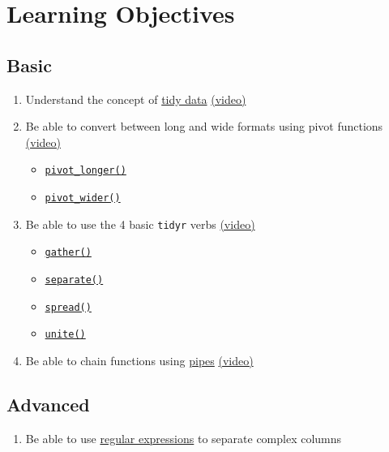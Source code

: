 \documentclass[
  oneside]{book}
\providecommand{\tightlist}{%
  \setlength{\itemsep}{0pt}\setlength{\parskip}{0pt}}
\begin{document}
\hypertarget{ilo-tidyr}{%
\section{Learning Objectives}\label{ilo-tidyr}}

\hypertarget{basic-2}{%
\subsection{Basic}\label{basic-2}}

\begin{enumerate}
\def\labelenumi{\arabic{enumi}.}
\tightlist
\item
  Understand the concept of \protect\hyperlink{tidy-data}{tidy data} \href{https://youtu.be/EsSN4OdsNpc}{(video)}
\item
  Be able to convert between long and wide formats using pivot functions \href{https://youtu.be/4dvLmjhwN8I}{(video)}

  \begin{itemize}
  \tightlist
  \item
    \protect\hyperlink{pivot_longer}{\texttt{pivot\_longer()}}
  \item
    \protect\hyperlink{pivot_wider}{\texttt{pivot\_wider()}}
  \end{itemize}
\item
  Be able to use the 4 basic \texttt{tidyr} verbs \href{https://youtu.be/oUWjb0JC8zM}{(video)}

  \begin{itemize}
  \tightlist
  \item
    \protect\hyperlink{gather}{\texttt{gather()}}
  \item
    \protect\hyperlink{separate}{\texttt{separate()}}
  \item
    \protect\hyperlink{spread}{\texttt{spread()}}
  \item
    \protect\hyperlink{unite}{\texttt{unite()}}
  \end{itemize}
\item
  Be able to chain functions using \protect\hyperlink{pipes}{pipes} \href{https://youtu.be/itfrlLaN4SE}{(video)}
\end{enumerate}

\hypertarget{advanced}{%
\subsection{Advanced}\label{advanced}}

\begin{enumerate}
\def\labelenumi{\arabic{enumi}.}
\setcounter{enumi}{4}
\tightlist
\item
  Be able to use \protect\hyperlink{regex}{regular expressions} to separate complex columns
\end{enumerate}
\end{document}
